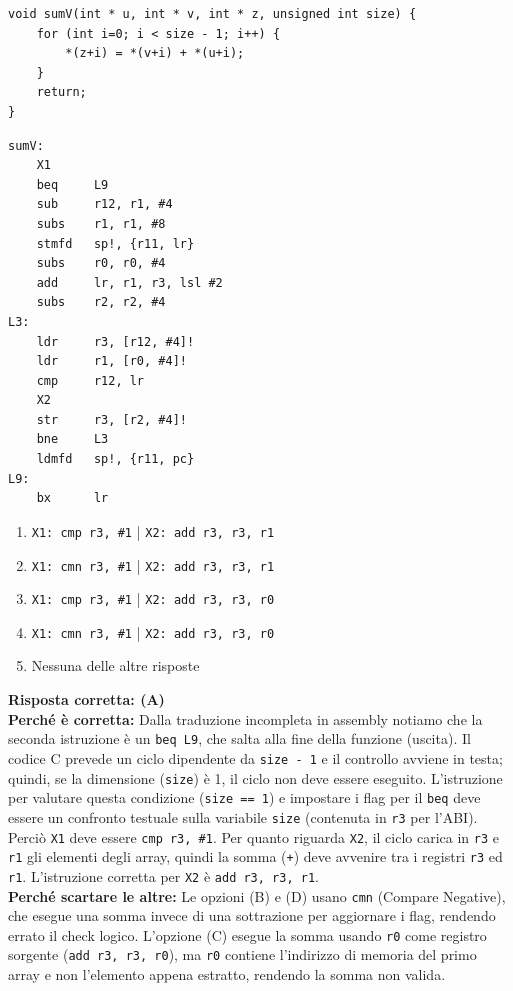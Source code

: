 \documentclass[12pt, a4paper]{article}
\begin{document}
\begin{enumerate}
\begin{verbatim}
void sumV(int * u, int * v, int * z, unsigned int size) {
    for (int i=0; i < size - 1; i++) {
        *(z+i) = *(v+i) + *(u+i);
    }
    return;
}
\end{verbatim}

\begin{verbatim}
sumV:
    X1
    beq     L9
    sub     r12, r1, #4
    subs    r1, r1, #8
    stmfd   sp!, {r11, lr}
    subs    r0, r0, #4
    add     lr, r1, r3, lsl #2
    subs    r2, r2, #4
L3:
    ldr     r3, [r12, #4]!
    ldr     r1, [r0, #4]!
    cmp     r12, lr
    X2
    str     r3, [r2, #4]!
    bne     L3
    ldmfd   sp!, {r11, pc}
L9:
    bx      lr
\end{verbatim}
    \begin{enumerate}[label=(\Alph*)]
        \item \texttt{X1: cmp r3, \#1} | \texttt{X2: add r3, r3, r1}
        \item \texttt{X1: cmn r3, \#1} | \texttt{X2: add r3, r3, r1}
        \item \texttt{X1: cmp r3, \#1} | \texttt{X2: add r3, r3, r0}
        \item \texttt{X1: cmn r3, \#1} | \texttt{X2: add r3, r3, r0}
        \item Nessuna delle altre risposte
    \end{enumerate}

\newpage

    \textbf{Risposta corretta: (A)} \\
    \textbf{Perché è corretta:} Dalla traduzione incompleta in assembly notiamo che la seconda istruzione è un \texttt{beq L9}, che salta alla fine della funzione (uscita). Il codice C prevede un ciclo dipendente da \texttt{size - 1} e il controllo avviene in testa; quindi, se la dimensione (\texttt{size}) è 1, il ciclo non deve essere eseguito. L'istruzione per valutare questa condizione (\texttt{size == 1}) e impostare i flag per il \texttt{beq} deve essere un confronto testuale sulla variabile \texttt{size} (contenuta in \texttt{r3} per l'ABI). Perciò \texttt{X1} deve essere \texttt{cmp r3, \#1}. Per quanto riguarda \texttt{X2}, il ciclo carica in \texttt{r3} e \texttt{r1} gli elementi degli array, quindi la somma (\texttt{+}) deve avvenire tra i registri \texttt{r3} ed \texttt{r1}. L'istruzione corretta per \texttt{X2} è \texttt{add r3, r3, r1}. \\
    \textbf{Perché scartare le altre:} Le opzioni (B) e (D) usano \texttt{cmn} (Compare Negative), che esegue una somma invece di una sottrazione per aggiornare i flag, rendendo errato il check logico. L'opzione (C) esegue la somma usando \texttt{r0} come registro sorgente (\texttt{add r3, r3, r0}), ma \texttt{r0} contiene l'indirizzo di memoria del primo array e non l'elemento appena estratto, rendendo la somma non valida.


\end{enumerate}
\end{document}
